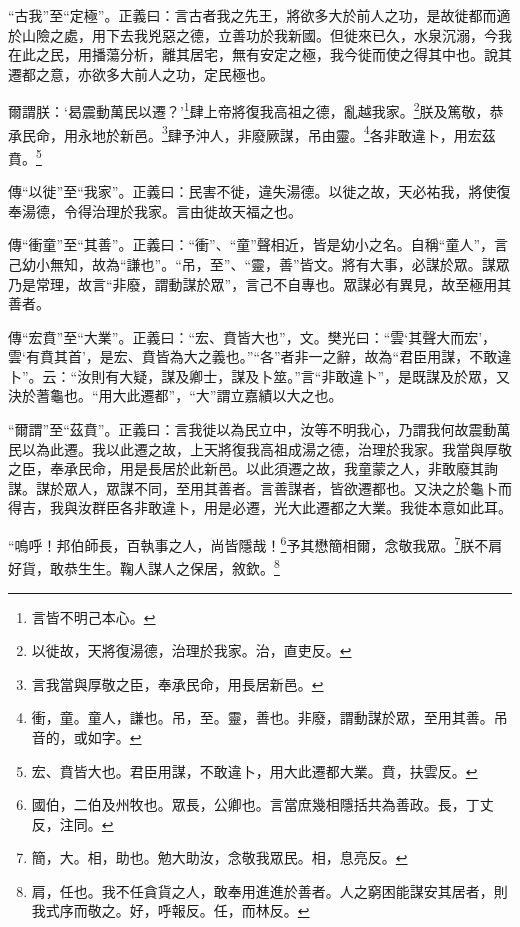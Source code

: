 {\noindent\shu{}\fzkt “古我”至“定極”。正義曰：言古者我之先王，將欲多大於前人之功，是故徙都而適於山險之處，用下去我兇惡之德，立善功於我新國。但徙來已久，水泉沉溺，今我在此之民，用播蕩分析，離其居宅，無有安定之極，我今徙而使之得其中也。說其遷都之意，亦欲多大前人之功，定民極也。 \par}

爾謂朕：‘曷震動萬民以遷？’\footnote{言皆不明己本心。}肆上帝將復我高祖之德，亂越我家。\footnote{以徙故，天將復湯德，治理於我家。治，直吏反。}朕及篤敬，恭承民命，用永地於新邑。\footnote{言我當與厚敬之臣，奉承民命，用長居新邑。}肆予沖人，非廢厥謀，吊由靈。\footnote{衝，童。童人，謙也。吊，至。靈，善也。非廢，謂動謀於眾，至用其善。吊音的，或如字。}各非敢違卜，用宏茲賁。\footnote{宏、賁皆大也。君臣用謀，不敢違卜，用大此遷都大業。賁，扶雲反。}

{\noindent\zhuan{}\fzbyks 傳“以徙”至“我家”。正義曰：民害不徙，違失湯德。以徙之故，天必祐我，將使復奉湯德，令得治理於我家。言由徙故天福之也。 \par}

{\noindent\zhuan{}\fzbyks 傳“衝童”至“其善”。正義曰：“衝”、“童”聲相近，皆是幼小之名。自稱“童人”，言己幼小無知，故為“謙也”。“吊，至”、“靈，善”皆文。將有大事，必謀於眾。謀眾乃是常理，故言“非廢，謂動謀於眾”，言己不自專也。眾謀必有異見，故至極用其善者。 \par}

{\noindent\zhuan{}\fzbyks 傳“宏賁”至“大業”。正義曰：“宏、賁皆大也”，文。樊光曰：“雲‘其聲大而宏’，雲‘有賁其首’，是宏、賁皆為大之義也。”“各”者非一之辭，故為“君臣用謀，不敢違卜”。云：“汝則有大疑，謀及卿士，謀及卜筮。”言“非敢違卜”，是既謀及於眾，又決於蓍龜也。“用大此遷都”，“大”謂立嘉績以大之也。 \par}

{\noindent\shu{}\fzkt “爾謂”至“茲賁”。正義曰：言我徙以為民立中，汝等不明我心，乃謂我何故震動萬民以為此遷。我以此遷之故，上天將復我高祖成湯之德，治理於我家。我當與厚敬之臣，奉承民命，用是長居於此新邑。以此須遷之故，我童蒙之人，非敢廢其詢謀。謀於眾人，眾謀不同，至用其善者。言善謀者，皆欲遷都也。又決之於龜卜而得吉，我與汝群臣各非敢違卜，用是必遷，光大此遷都之大業。我徙本意如此耳。 \par}

“嗚呼！邦伯師長，百執事之人，尚皆隱哉！\footnote{國伯，二伯及州牧也。眾長，公卿也。言當庶幾相隱括共為善政。長，丁丈反，注同。}予其懋簡相爾，念敬我眾。\footnote{簡，大。相，助也。勉大助汝，念敬我眾民。相，息亮反。}朕不肩好貨，敢恭生生。鞠人謀人之保居，敘欽。\footnote{肩，任也。我不任貪貨之人，敢奉用進進於善者。人之窮困能謀安其居者，則我式序而敬之。好，呼報反。任，而林反。}

